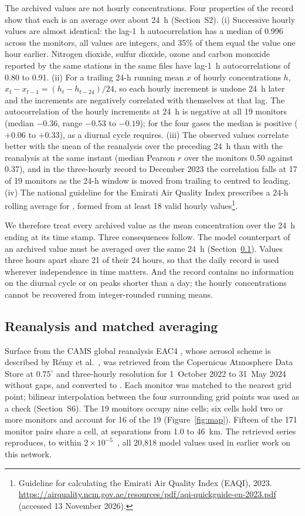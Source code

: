 The archived \pmten{} values are not hourly concentrations. Four properties of the record show
that each is an average over about 24~h (Section~S2). (i) Successive hourly values are almost
identical: the lag-1~h autocorrelation has a median of 0.996 across the monitors, all values are
integers, and 35\% of them equal the value one hour earlier. Nitrogen dioxide, sulfur dioxide,
ozone and carbon monoxide reported by the same stations in the same files have lag-1~h
autocorrelations of 0.80 to 0.91. (ii) For a trailing 24-h running mean $x$ of hourly
concentrations $h$, $x_t-x_{t-1}=(h_t-h_{t-24})/24$, so each hourly increment is undone 24~h
later and the increments are negatively correlated with themselves at that lag. The
autocorrelation of the hourly \pmten{} increments at 24~h is negative at all 19 monitors (median
$-0.36$, range $-0.53$ to $-0.19$); for the four gases the median is positive ($+0.06$ to
$+0.33$), as a diurnal cycle requires. (iii) The observed values correlate better with the mean
of the reanalysis over the preceding 24~h than with the reanalysis at the same instant (median
Pearson $r$ over the monitors 0.50 against 0.37), and in the three-hourly record to December 2023
the correlation falls at 17 of 19 monitors as the 24-h window is moved from trailing to centred
to leading. (iv) The national guideline for the Emirati Air Quality Index prescribes a 24-h
rolling average for \pmten{}, formed from at least 18 valid hourly values\footnote{Guideline for calculating the Emirati Air Quality Index (EAQI), 2023. \url{https://airquality.ncm.gov.ae/resources/pdf/aqi-quickguide-en-2023.pdf} (accessed 13 November 2026).}.

We therefore treat every archived value as the mean concentration over the 24~h ending at its
time stamp. Three consequences follow. The model counterpart of an archived value must be averaged
over the same 24~h (Section~\ref{sec:cams}). Values three hours apart share 21 of their 24 hours,
so that the daily record is used wherever independence in time matters. And the record contains
no information on the diurnal cycle or on peaks shorter than a day; the hourly concentrations
cannot be recovered from integer-rounded running means.

\subsection{Reanalysis and matched averaging}
\label{sec:cams}

Surface \pmten{} from the CAMS global reanalysis EAC4 \citep{inness2019}, whose aerosol scheme is
described by R\'emy et al.~\citep{remy2019}, was retrieved from the Copernicus Atmosphere Data Store at
$0.75^{\circ}$ and three-hourly resolution for 1~October 2022 to 31~May 2024 without gaps, and
converted to \ugm{}. Each monitor was matched to the nearest grid point; bilinear interpolation
between the four surrounding grid points was used as a check (Section~S6). The 19 monitors occupy
nine cells; six cells hold two or more monitors and account for 16 of the 19
(Figure~\ref{fig:map}). Fifteen of the 171 monitor pairs share a cell, at separations from 1.0 to
46~km. The retrieved series reproduces, to within $2\times10^{-5}$~\ugm{}, all 20,818 model values
used in earlier work on this network.

